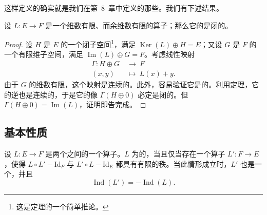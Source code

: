 这样定义的\trFredholmOperator{}确实就是我们在第~8~章中定义的那些。我们有下述结果。

\begin{proposition}\label{thm:appC-fredholm-image-closed}
设 $L : E \to F$ 是一个\trKernel{}维数有限、而\trImage{}余维数有限的算子；那么它的\trImage{}是闭的。
\end{proposition}

\begin{proof}
设 $H$ 是 $E$ 的一个闭子空间\footnote{这是\trHahnBanach{}定理的一个简单推论。}，满足 $\operatorname{Ker}(L) \oplus H = E$；又设 $G$ 是 $F$ 的一个有限维子空间，满足 $\operatorname{Im}(L) \oplus G = F$。考虑线性映射
\[
\begin{aligned}
\Gamma : H \oplus G\ &\longrightarrow\ F \\
(x, y)\ &\longmapsto\ L(x) + y.
\end{aligned}
\]
由于 $G$ 的维数有限，这个映射是连续的。此外，容易验证它是\trBijective{}的。利用\trBanach{}定理，它的逆也是连续的，于是它的像 $\Gamma(H \oplus 0)$ 必定是闭的。但 $\Gamma(H \oplus 0) = \operatorname{Im}(L)$，证明即告完成。
\end{proof}

\subsection{基本性质}
\label{subsec:appC-basic-properties}

\begin{proposition}\label{thm:appC-fredholm-parametrix}
设 $L : E \to F$ 是两个\trBanachSpace{}之间的一个算子。$L$ 为\trFredholm{}的，当且仅当存在一个算子 $L' : F \to E$，使得 $L \circ L' - \mathrm{Id}_F$ 与 $L' \circ L - \mathrm{Id}_E$ 都具有有限的秩。当此情形成立时，$L'$ 也是一个\trFredholmOperator，并且
\[
\operatorname{Ind}(L') = -\operatorname{Ind}(L).
\]
\end{proposition}

